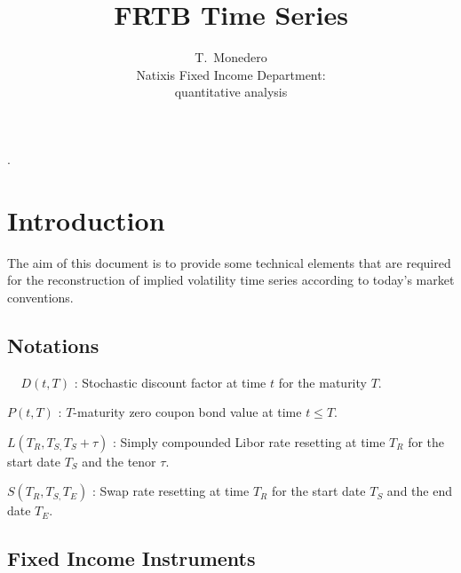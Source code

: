 \documentclass[3pt]{article}
\begin{document}
\title{FRTB Time Series}
\author{T.\ Monedero \\
Natixis Fixed Income Department:\\
quantitative analysis }
\maketitle

\begin{abstract}
\end{abstract}

\tableofcontents

.

\bigskip

\bigskip

\bigskip

\bigskip

\bigskip

\bigskip

\bigskip

\bigskip

\bigskip

\bigskip

\bigskip

\section{Introduction}

The aim of this document is to provide some technical elements that are
required for the reconstruction of implied volatility time series according
to today's market conventions.

\subsection{Notations}

$\ \ \ \ \ D(t,T)$ : Stochastic discount factor at time $t$ for the maturity 
$T$.

\bigskip

$P(t,T)$ : $T$-maturity zero coupon bond value at time $t\leq T$.

\bigskip

$L(T_{R},T_{S,}T_{S}+\tau )$ : Simply compounded Libor rate resetting at
time $T_{R}$ for the start date $T_{S}$ and the tenor $\tau $.

\bigskip

$S(T_{R},T_{S,}T_{E})$ : Swap rate resetting at time $T_{R}$ for the start
date $T_{S}$ and the end date $T_{E}$.

\subsection{Fixed Income Instruments}
\end{document}
